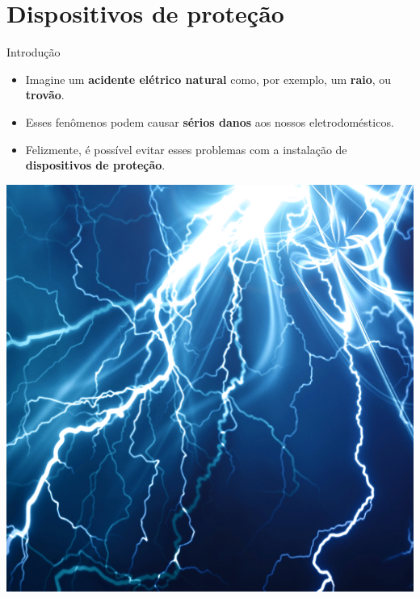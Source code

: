 \section{Dispositivos de proteção}

\begin{frame}{Introdução}
	\begin{block}{}
		\begin{itemize}
			\item Imagine um \textbf{acidente elétrico natural} como, por exemplo, um \textbf{raio}, ou \textbf{trovão}.
			\item Esses fenômenos podem causar \textbf{sérios danos} aos nossos eletrodomésticos.
			\item Felizmente, é possível evitar esses problemas com a instalação de \textbf{dispositivos de proteção}.
		\end{itemize}
	\end{block}

	\centering
	\includegraphics[height=0.5\textheight]{Figuras/Ch04/fig11}

\end{frame}



